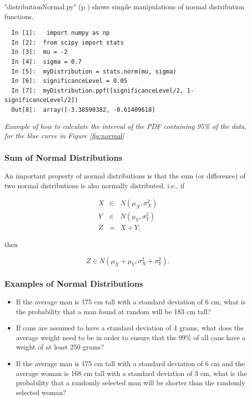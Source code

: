 \vspace{5 mm}

\PyImg "distributionNormal.py" (p \pageref{py:distributionNormal}) shows simple manipulations of normal distribution functions.

\begin{lstlisting}
  In [1]:   import numpy as np
  In [2]:  from scipy import stats
  In [3]:  mu = -2
  In [4]:  sigma = 0.7
  In [5]:  myDistribution = stats.norm(mu, sigma)
  In [6]:  significanceLevel = 0.05
  In [7]:  myDistribution.ppf([significanceLevel/2, 1-significanceLevel/2])
  Out[8]:  array([-3.38590382, -0.61409618]
\end{lstlisting}

\emph{Example of how to calculate the interval of the PDF containing 95\% of the data, for the blue curve in Figure \ref{fig:normal}}

\subsubsection{Sum of Normal Distributions}

An important property of normal distributions is that the sum (or difference) of two normal distributions is also normally distributed. i.e., if

\begin{eqnarray*}
    X &\in& N(\mu_X, \sigma_X^2) \\
    Y &\in& N(\mu_Y, \sigma_Y^2) \\
    Z &=& X + Y,
\end{eqnarray*}

then

\begin{equation}\label{eq:sumOfGaussians}
    Z \in N(\mu_X + \mu_Y, \sigma_X^2 + \sigma_Y^2).
\end{equation}

\subsubsection{Examples of Normal Distributions}

\begin{itemize}
    \item If the average man is 175 cm tall with a standard deviation of 6 cm, what is the probability that a man found at random will be 183 cm tall?
    \item If cans are assumed to have a standard deviation of 4 grams, what does the average weight need to be in order to ensure that the 99\% of all cans have a weight of at least 250 grams?
   \item If the average man is 175 cm tall with a standard deviation of 6 cm and the average woman is 168 cm tall with a standard deviation of 3 cm, what is the probability that a randomly selected man will be shorter than the randomly selected woman?
\end{itemize}

